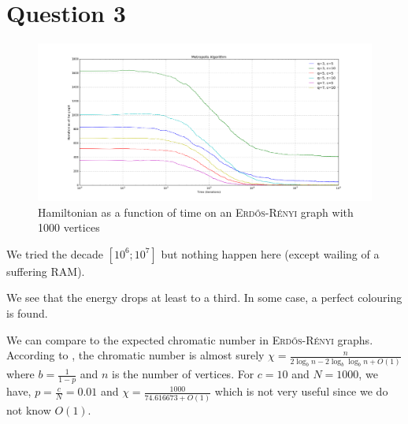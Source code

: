 \documentclass[a4paper, 11pt]{article}
\begin{document}
\section{Question 3}

\begin{figure}[!ht]
    \centering
    \includegraphics[width=\textwidth]{figures/q3}
    \caption{Hamiltonian as a function of time on an \textsc{Erd\H{o}s-Rényi} graph with 1000 vertices}
\end{figure}

We tried the decade $[10^6; 10^7]$ but nothing happen here (except wailing of a suffering RAM).

We see that the energy drops at least to a third. In some case, a perfect colouring is found.

\FloatBarrier

We can compare to the expected chromatic number in  \textsc{Erd\H{o}s-Rényi} graphs. According to \cite{mcdiarmid1990chromatic}, the chromatic number is almost surely $\chi=\frac{n}{2 \log_b n-2 \log_b \log_b n + O(1)}$ where $b = \frac{1}{1 - p}$ and $n$ is the number of vertices. For $c = 10$ and $N = 1000$, we have, $p = \frac{c}{N} = 0.01$ and $\chi = \frac{1000}{74.616673+O(1)}$ which is not very useful since we do not know $O(1)$.
\end{document}
